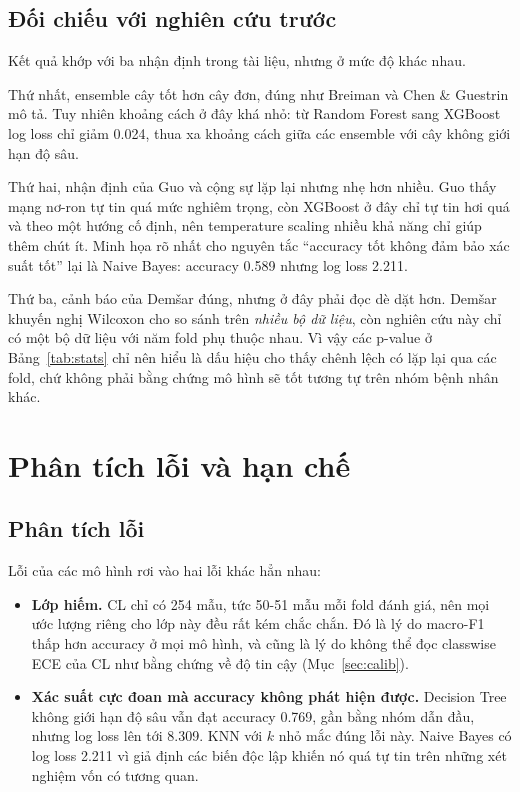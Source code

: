 \documentclass[12pt]{template/ai_conquer2026}
\begin{document}
\subsection{Đối chiếu với nghiên cứu trước}

Kết quả khớp với ba nhận định trong tài liệu, nhưng ở mức độ khác nhau.

Thứ nhất, ensemble cây tốt hơn cây đơn, đúng như Breiman \cite{breiman2001random}
và Chen \& Guestrin \cite{chen2016xgboost} mô tả. Tuy nhiên khoảng cách ở đây khá
nhỏ: từ Random Forest sang XGBoost log loss chỉ giảm 0.024, thua xa khoảng cách
giữa các ensemble với cây không giới hạn độ sâu.

Thứ hai, nhận định của Guo và cộng sự \cite{guo2017calibration} lặp lại nhưng nhẹ
hơn nhiều. Guo thấy mạng nơ-ron tự tin quá mức nghiêm trọng, còn XGBoost ở đây chỉ
tự tin hơi quá và theo một hướng cố định, nên temperature scaling nhiều khả năng
chỉ giúp thêm chút ít. Minh họa rõ nhất cho nguyên tắc ``accuracy tốt không đảm
bảo xác suất tốt'' lại là Naive Bayes: accuracy 0.589 nhưng log loss 2.211.

Thứ ba, cảnh báo của Demšar \cite{demsar2006statistical} đúng, nhưng ở đây phải
đọc dè dặt hơn. Demšar khuyến nghị Wilcoxon cho so sánh trên \emph{nhiều bộ dữ
liệu}, còn nghiên cứu này chỉ có một bộ dữ liệu với năm fold phụ thuộc nhau. Vì
vậy các p-value ở Bảng~\ref{tab:stats} chỉ nên hiểu là dấu hiệu cho thấy chênh
lệch có lặp lại qua các fold, chứ không phải bằng chứng mô hình sẽ tốt tương tự
trên nhóm bệnh nhân khác.

\section{Phân tích lỗi và hạn chế}

\subsection{Phân tích lỗi}

Lỗi của các mô hình rơi vào hai lỗi khác hẳn nhau:

\begin{itemize}
\item \textbf{Lớp hiếm.} CL chỉ có 254 mẫu, tức 50-51 mẫu mỗi fold đánh
giá, nên mọi ước lượng riêng cho lớp này đều rất kém chắc chắn. Đó là lý do
macro-F1 thấp hơn accuracy ở mọi mô hình, và cũng là lý do không thể đọc classwise
ECE của CL như bằng chứng về độ tin cậy (Mục~\ref{sec:calib}).
\item \textbf{Xác suất cực đoan mà accuracy không phát hiện được.}
Decision Tree không giới hạn độ sâu vẫn đạt accuracy 0.769, gần bằng nhóm dẫn đầu,
nhưng log loss lên tới 8.309. KNN với $k$ nhỏ mắc đúng lỗi này. Naive Bayes có log
loss 2.211 vì giả định các biến độc lập khiến nó quá tự tin trên những xét nghiệm
vốn có tương quan.
\end{itemize}
\end{document}
